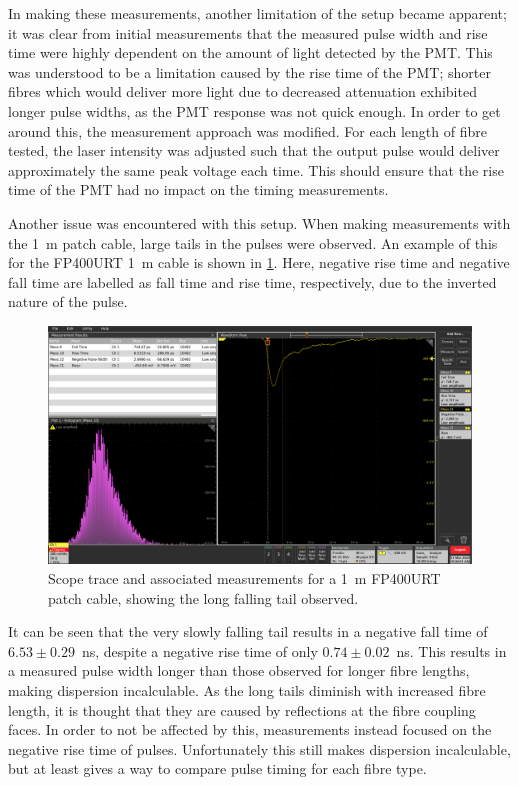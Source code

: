 \documentclass[a4paper,11pt]{article}
\begin{document}
In making these measurements, another limitation of the setup became apparent; it was clear from initial measurements that the measured pulse width and rise time were highly dependent on the amount of light detected by the PMT. This was understood to be a limitation caused by the rise time of the PMT; shorter fibres which would deliver more light due to decreased attenuation exhibited longer pulse widths, as the PMT response was not quick enough. In order to get around this, the measurement approach was modified. For each length of fibre tested, the laser intensity was adjusted such that the output pulse would deliver approximately the same peak voltage each time. This should ensure that the rise time of the PMT had no impact on the timing measurements.

Another issue was encountered with this setup. When making measurements with the 1~m patch cable, large tails in the pulses were observed. An example of this for the FP400URT 1~m cable is shown in \cref{fig:fp400urt1m}. Here, negative rise time and negative fall time are labelled as fall time and rise time, respectively, due to the inverted nature of the pulse.
\begin{figure}[h]
\centering
\includegraphics[width=\textwidth]{FP400URT_1m_1.png}
\caption{Scope trace and associated measurements for a 1~m FP400URT patch cable, showing the long falling tail observed.}\label{fig:fp400urt1m}
\end{figure}
It can be seen that the very slowly falling tail results in a negative fall time of $6.53\pm0.29$~ns, despite a negative rise time of only $0.74\pm0.02$~ns. This results in a measured pulse width longer than those observed for longer fibre lengths, making dispersion incalculable. As the long tails diminish with increased fibre length, it is thought that they are caused by reflections at the fibre coupling faces. In order to not be affected by this, measurements instead focused on the negative rise time of pulses. Unfortunately this still makes dispersion incalculable, but at least gives a way to compare pulse timing for each fibre type.
\end{document}
